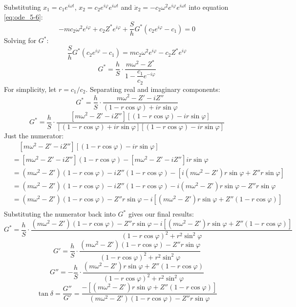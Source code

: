 \documentclass[12pt, a4paper]{article}
\numberwithin{equation}{section}
\begin{document}
Substituting $x_1 = c_1 e^{i\omega t}$, $x_2 = c_2 e^{i\varphi} e^{i\omega t}$ 
and $\ddot{x}_2 = -c_2\omega^2 e^{i\varphi} e^{i\omega t}$ into equation \ref{eq:ode_5-6}:
\[
	-mc_2\omega^2 e^{i\varphi} + c_2 Z^* e^{i\varphi} 
	+ \frac{S}{h}G^*\left(c_2 e^{i\varphi} - c_1\right) = 0
\]
Solving for $G^*$:
\[
	\frac{S}{h}G^*\left(c_2 e^{i\varphi} - c_1\right) 
	= mc_2\omega^2 e^{i\varphi} - c_2 Z^* e^{i\varphi}
\]
\[
	G^* = \frac{h}{S} \cdot \frac{m\omega^2 - Z^*}{1 - \dfrac{c_1}{c_2}e^{-i\varphi}}
\]
For simplicity, let $r = c_1/c_2$. Separating real and imaginary components:
\[
	G^* = \frac{h}{S} \cdot 
	\frac{m\omega^2 - Z' - iZ''}{(1 - r\cos\varphi) + ir\sin\varphi}
\]
\[
	G^* = \frac{h}{S} \cdot 
	\frac{[m\omega^2 - Z' - iZ''][(1 - r\cos\varphi) - ir\sin\varphi]}{[(1 - r\cos\varphi) + ir\sin\varphi][(1 - r\cos\varphi) - ir\sin\varphi]}
\]
Just the numerator:
\begin{align*}
	&\quad [m\omega^2 - Z' - iZ''][(1 - r\cos\varphi) - ir\sin\varphi]\\
	&= [m\omega^2 - Z' - iZ''](1 - r\cos\varphi) - [m\omega^2 - Z' - iZ'']ir\sin\varphi\\
	&= (m\omega^2 - Z')(1 - r\cos\varphi) - iZ''(1 - r\cos\varphi) - [i(m\omega^2 - Z')r\sin\varphi + Z''r\sin\varphi]\\
	&= (m\omega^2 - Z')(1 - r\cos\varphi) - iZ''(1 - r\cos\varphi) - i(m\omega^2 - Z')r\sin\varphi - Z''r\sin\varphi \\
	&= (m\omega^2 - Z')(1 - r\cos\varphi) - Z''r\sin\varphi - i[(m\omega^2 - Z')r\sin\varphi + Z''(1 - r\cos\varphi)] \\
\end{align*}
Substituting the numerator back into $G^*$ gives our final results:
\[
	G^* = \frac{h}{S} \cdot 
	\frac{(m\omega^2 - Z')(1 - r\cos\varphi) - Z''r\sin\varphi 
	  - i[(m\omega^2 - Z')r\sin\varphi + Z''(1 - r\cos\varphi)]}{
		(1 - r\cos\varphi)^2 + r^2\sin^2\varphi}
\]
\[
	G' = \frac{h}{S} \cdot 
		\frac{(m\omega^2 - Z')(1 - r\cos\varphi) - Z''r\sin\varphi}{
		(1 - r\cos\varphi)^2 + r^2\sin^2\varphi}
\]
\[
	G'' = - \frac{h}{S} \cdot 
	\frac{(m\omega^2 - Z')r\sin\varphi + Z''(1 - r\cos\varphi)}{
		(1 - r\cos\varphi)^2 + r^2\sin^2\varphi}
\]
\[
	\tan\delta = \frac{G''}{G'} = 
	\frac{- [(m\omega^2 - Z')r\sin\varphi + Z''(1 - r\cos\varphi)]}{
		(m\omega^2 - Z')(1 - r\cos\varphi) - Z''r\sin\varphi}
\]
\end{document}

